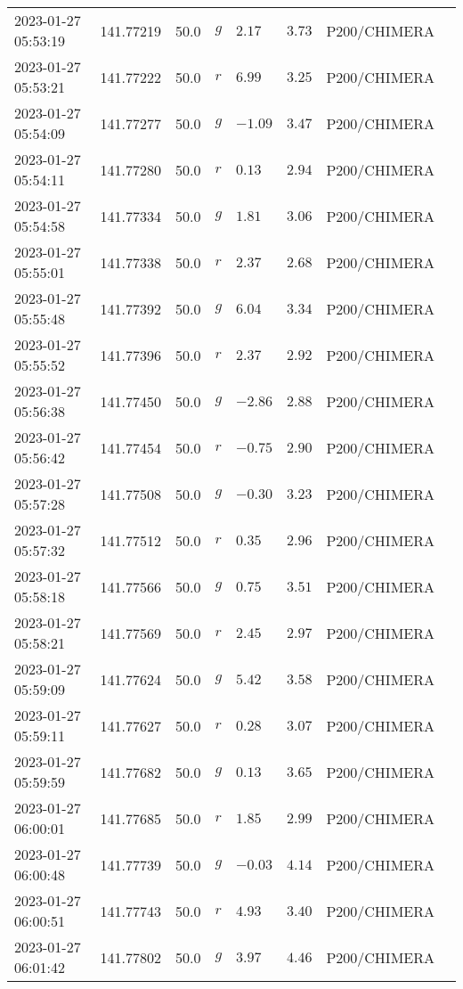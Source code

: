 \documentclass{nature_plusfigure}
\begin{document}
\begin{supplement}
\begin{center}
\begin{longtable}{llllllll}
2023-01-27 05:53:19 & 141.77219 & 50.0 & $g$ & $2.17$ & $3.73$ & P200/CHIMERA &  \\ 
2023-01-27 05:53:21 & 141.77222 & 50.0 & $r$ & $6.99$ & $3.25$ & P200/CHIMERA &  \\ 
2023-01-27 05:54:09 & 141.77277 & 50.0 & $g$ & $-1.09$ & $3.47$ & P200/CHIMERA &  \\ 
2023-01-27 05:54:11 & 141.77280 & 50.0 & $r$ & $0.13$ & $2.94$ & P200/CHIMERA &  \\ 
2023-01-27 05:54:58 & 141.77334 & 50.0 & $g$ & $1.81$ & $3.06$ & P200/CHIMERA &  \\ 
2023-01-27 05:55:01 & 141.77338 & 50.0 & $r$ & $2.37$ & $2.68$ & P200/CHIMERA &  \\ 
2023-01-27 05:55:48 & 141.77392 & 50.0 & $g$ & $6.04$ & $3.34$ & P200/CHIMERA &  \\ 
2023-01-27 05:55:52 & 141.77396 & 50.0 & $r$ & $2.37$ & $2.92$ & P200/CHIMERA &  \\ 
2023-01-27 05:56:38 & 141.77450 & 50.0 & $g$ & $-2.86$ & $2.88$ & P200/CHIMERA &  \\ 
2023-01-27 05:56:42 & 141.77454 & 50.0 & $r$ & $-0.75$ & $2.90$ & P200/CHIMERA &  \\ 
2023-01-27 05:57:28 & 141.77508 & 50.0 & $g$ & $-0.30$ & $3.23$ & P200/CHIMERA &  \\ 
2023-01-27 05:57:32 & 141.77512 & 50.0 & $r$ & $0.35$ & $2.96$ & P200/CHIMERA &  \\ 
2023-01-27 05:58:18 & 141.77566 & 50.0 & $g$ & $0.75$ & $3.51$ & P200/CHIMERA &  \\ 
2023-01-27 05:58:21 & 141.77569 & 50.0 & $r$ & $2.45$ & $2.97$ & P200/CHIMERA &  \\ 
2023-01-27 05:59:09 & 141.77624 & 50.0 & $g$ & $5.42$ & $3.58$ & P200/CHIMERA &  \\ 
2023-01-27 05:59:11 & 141.77627 & 50.0 & $r$ & $0.28$ & $3.07$ & P200/CHIMERA &  \\ 
2023-01-27 05:59:59 & 141.77682 & 50.0 & $g$ & $0.13$ & $3.65$ & P200/CHIMERA &  \\ 
2023-01-27 06:00:01 & 141.77685 & 50.0 & $r$ & $1.85$ & $2.99$ & P200/CHIMERA &  \\ 
2023-01-27 06:00:48 & 141.77739 & 50.0 & $g$ & $-0.03$ & $4.14$ & P200/CHIMERA &  \\ 
2023-01-27 06:00:51 & 141.77743 & 50.0 & $r$ & $4.93$ & $3.40$ & P200/CHIMERA &  \\ 
2023-01-27 06:01:42 & 141.77802 & 50.0 & $g$ & $3.97$ & $4.46$ & P200/CHIMERA &  \\ 

\end{longtable}
\end{center}
\end{supplement}
\end{document}
